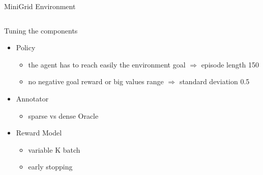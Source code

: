 \begin{frame}{MiniGrid Environment}
\begin{columns}
\begin{column}{0.6\textwidth}
        \end{column}
        \begin{column}{0.4\textwidth}
        \end{column}
        
    \end{columns}
    
\end{frame}

\begin{frame}{Tuning the components}
    \begin{itemize}
        \item Policy
        \begin{itemize}
            \item the agent has to reach easily the  environment goal $\Rightarrow$ episode length 150
            \item no negative goal reward or big values range $\Rightarrow$ standard deviation 0.5 
        \end{itemize} 

        \vspace{0.2cm}
        \pause
        \item Annotator
        \begin{itemize}
            \item sparse vs dense Oracle
        \end{itemize}
        
        \vspace{0.2cm}
        \pause
        \item Reward Model
        \begin{itemize}
            \item variable K batch
            \item early stopping
        \end{itemize}
    \end{itemize}
\end{frame}

